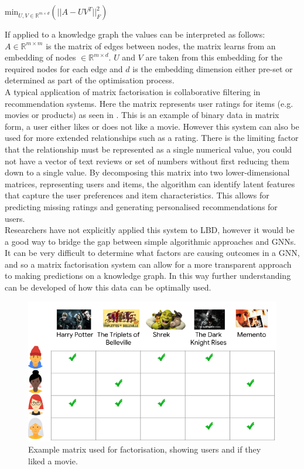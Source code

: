 \documentclass{l4proj}
\begin{document}
\begin{center}
    $\text{min}_{U,V\in \mathbb{R}^{m\times d}}\left (||A - UV^T||_{F}^{2}\right )$
\end{center}

If applied to a knowledge graph the values can be interpreted as follows: $A \in \mathbb{R}^{m\times m}$ is the matrix of edges between nodes, the matrix learns from an embedding of nodes $ \in \mathbb{R}^{m\times d}$. $U$ and $V$ are taken from this embedding for the required nodes for each edge and $d$ is the embedding dimension either pre-set or determined as part of the optimisation process. \\

A typical application of matrix factorisation is collaborative filtering in recommendation systems. Here the matrix represents user ratings for items (e.g. movies or products) as seen in . This is an example of binary data in matrix form, a user either likes or does not like a movie. However this system can also be used for more extended relationships such as a rating. There is the limiting factor that the relationship must be represented as a single numerical value, you could not have a vector of text reviews or set of numbers without first reducing them down to a single value. By decomposing this matrix into two lower-dimensional matrices, representing users and items, the algorithm can identify latent features that capture the user preferences and item characteristics. This allows for predicting missing ratings and generating personalised recommendations for users. \\

Researchers have not explicitly applied this system to LBD, however it would be a good way to bridge the gap between simple algorithmic approaches and GNNs. It can be very difficult to determine what factors are causing outcomes in a GNN, and so a matrix factorisation system can allow for a more transparent approach to making predictions on a knowledge graph. In this way further understanding can be developed of how this data can be optimally used. \\ 

\begin{figure}[h]
    \centering
    \includegraphics[width=\linewidth]{images/matrix_fact_example.png}
    \caption{Example matrix used for factorisation, showing users and if they liked a movie. \citep{matrix_fact}}
    \label{fig:matrix_fact_example}
\end{figure}
\end{document}
